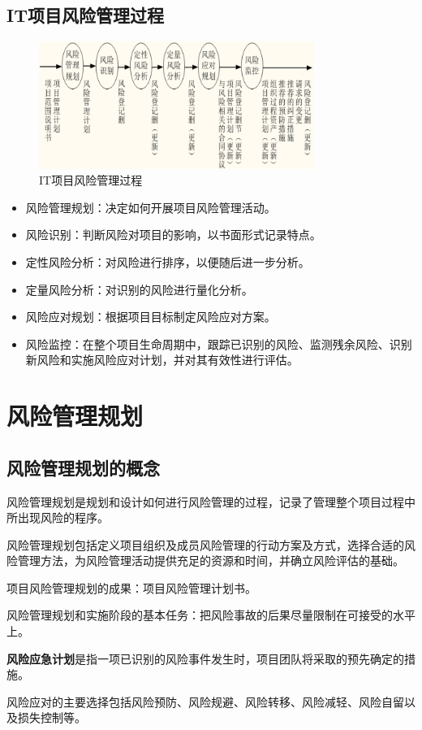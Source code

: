 \subsection{IT项目风险管理过程}
\begin{figure}[!h]
	\centering
	\includegraphics[width=0.8\textwidth]{image/10-1}
	\caption{IT项目风险管理过程}
\end{figure}
\begin{itemize}
	\item 风险管理规划：决定如何开展项目风险管理活动。
	\item 风险识别：判断风险对项目的影响，以书面形式记录特点。
	\item 定性风险分析：对风险进行排序，以便随后进一步分析。
	\item 定量风险分析：对识别的风险进行量化分析。
	\item 风险应对规划：根据项目目标制定风险应对方案。
	\item 风险监控：在整个项目生命周期中，跟踪已识别的风险、监测残余风险、识别新风险和实施风险应对计划，并对其有效性进行评估。
\end{itemize}
\section{风险管理规划}
\subsection{风险管理规划的概念}
风险管理规划是规划和设计如何进行风险管理的过程，记录了管理整个项目过程中所出现风险的程序。
\par 风险管理规划包括定义项目组织及成员风险管理的行动方案及方式，选择合适的风险管理方法，为风险管理活动提供充足的资源和时间，并确立风险评估的基础。 
\par 项目风险管理规划的成果：项目风险管理计划书。
\par 风险管理规划和实施阶段的基本任务：把风险事故的后果尽量限制在可接受的水平上。
\par \textbf{风险应急计划}是指一项已识别的风险事件发生时，项目团队将采取的预先确定的措施。
\par 风险应对的主要选择包括风险预防、风险规避、风险转移、风险减轻、风险自留以及损失控制等。
